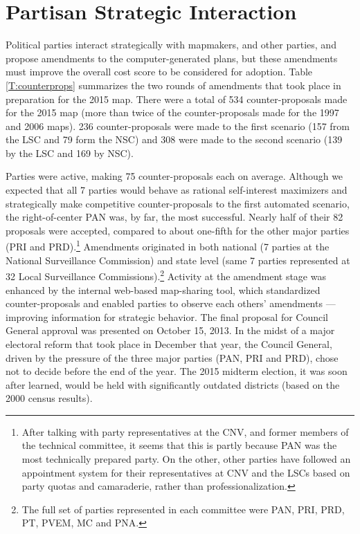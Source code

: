 \documentclass[letter,12pt]{article}
\begin{document}
\section{Partisan Strategic Interaction}

Political parties interact strategically with mapmakers, and other parties, and propose amendments to the computer-generated plans, but these amendments must improve the overall cost score to be considered for adoption. Table \ref{T:counterprops} summarizes the two rounds of amendments that took place in preparation for the 2015 map. There were a total of 534 counter-proposals made for the 2015 map (more than twice of the counter-proposals made for the 1997 and 2006 maps). 236 counter-proposals were made to the first scenario (157 from the LSC and 79 form the NSC) and 308 were made to the second scenario (139 by the LSC and 169 by NSC).

Parties were active, making 75 counter-proposals each on average. Although we expected that all 7 parties would behave as rational self-interest maximizers and strategically make competitive counter-proposals to the first automated scenario, the right-of-center PAN was, by far, the most successful. Nearly half of their 82 proposals were accepted, compared to about one-fifth for the other major parties (PRI and PRD).\footnote{After talking with party representatives at the CNV, and former members of the technical committee, it seems that this is partly because PAN was the most technically prepared party. On the other, other parties have followed an appointment system for their representatives at CNV and the LSCs based on party quotas and camaraderie, rather than professionalization.} Amendments originated in both national (7 parties at the National Surveillance Commission) and state level (same 7 parties represented at 32 Local Surveillance Commissions).\footnote{The full set of parties represented in each committee were PAN, PRI, PRD, PT, PVEM, MC and PNA.} Activity at the amendment stage was enhanced by the internal web-based map-sharing tool, which standardized counter-proposals and enabled parties to observe each others' amendments --- improving information for strategic behavior. The final proposal for Council General approval was presented on October 15, 2013. In the midst of a major electoral reform that took place in December that year, the Council General, driven by the pressure of the three major parties (PAN, PRI and PRD), chose not to decide before the end of the year. The 2015 midterm election, it was soon after learned, would be held with significantly outdated districts (based on the 2000 census results). 
\end{document}

